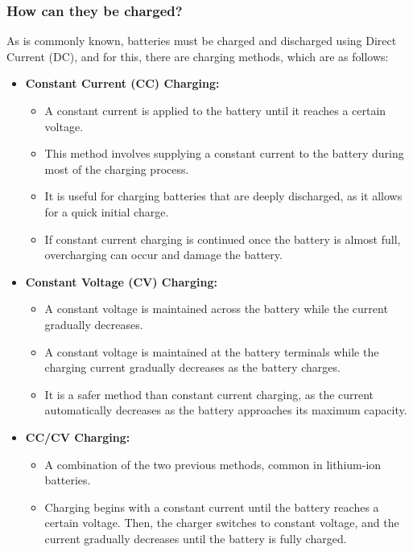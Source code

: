\subsubsection{How can they be charged?}

As is commonly known, batteries must be charged and discharged using Direct Current (DC), and for this, there are charging methods, which are as follows:

\begin{itemize}
    \item \textbf{Constant Current (CC) Charging:}
    \begin{itemize}
      \item A constant current is applied to the battery until it reaches a certain voltage.
      \item This method involves supplying a constant current to the battery during most of the charging process.
      \item It is useful for charging batteries that are deeply discharged, as it allows for a quick initial charge.
      \item If constant current charging is continued once the battery is almost full, overcharging can occur and damage the battery.
    \end{itemize}
    \item \textbf{Constant Voltage (CV) Charging:}
    \begin{itemize}
      \item A constant voltage is maintained across the battery while the current gradually decreases.
      \item A constant voltage is maintained at the battery terminals while the charging current gradually decreases as the battery charges.
      \item It is a safer method than constant current charging, as the current automatically decreases as the battery approaches its maximum capacity.
    \end{itemize}
    \item \textbf{CC/CV Charging:}
    \begin{itemize}
      \item A combination of the two previous methods, common in lithium-ion batteries.
      \item Charging begins with a constant current until the battery reaches a certain voltage. Then, the charger switches to constant voltage, and the current gradually decreases until the battery is fully charged.
    \end{itemize}
\end{itemize}

